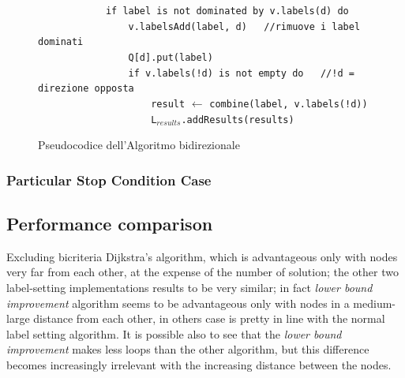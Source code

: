 \documentclass[a4paper,11pt]{report}
\begin{document}
\begin{figure}[H]
	\verb|            if label is not dominated by v.labels(d) do			|	\\
	\verb|                v.labelsAdd(label, d)   //rimuove i label dominati|\\
	\verb|                Q[d].put(label)|\\
	\verb|                if v.labels(!d) is not empty do   //!d = direzione opposta|\\
	\verb|                    result| $\leftarrow$ \verb|combine(label, v.labels(!d))|\\
	\verb|                    L|$_{results}$\verb|.addResults(results)|
	\caption{Pseudocodice dell'Algoritmo bidirezionale}
	\label{fig:bidirectional}
\end{figure}
\subsubsection{Particular Stop Condition Case}

\subsection{Performance comparison}
Excluding bicriteria Dijkstra's algorithm, which is advantageous only with nodes very far from each other, at the expense of the number of solution; the other two label-setting implementations results to be very similar; in fact \textit{lower bound improvement} algorithm seems to be advantageous only with nodes in a medium-large distance from each other, in others case is pretty in line with the normal label setting algorithm. It is possible also to see that the \textit{lower bound improvement} makes less loops than the other algorithm, but this difference becomes increasingly irrelevant with the increasing distance between the nodes.
\end{document}
